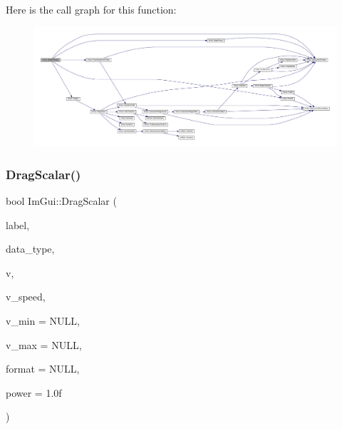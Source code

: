 Here is the call graph for this function\+:
\nopagebreak
\begin{figure}[H]
\begin{center}
\leavevmode
\includegraphics[width=350pt]{namespace_im_gui_ae3c5fcb2ff6c529d518a646a97a65186_cgraph}
\end{center}
\end{figure}
\mbox{\label{namespace_im_gui_a127eccba6a956933f8c0f35b9e55105e}} 
\subsubsection{\texorpdfstring{Drag\+Scalar()}{DragScalar()}}
{\footnotesize\ttfamily bool Im\+Gui\+::\+Drag\+Scalar (\begin{DoxyParamCaption}\item[{const char $\ast$}]{label,  }\item[{\mbox{\hyperlink{imgui_8h_a4cfa8697a3d76722fff83eb18922e9d5}{Im\+Gui\+Data\+Type}}}]{data\+\_\+type,  }\item[{void $\ast$}]{v,  }\item[{float}]{v\+\_\+speed,  }\item[{const void $\ast$}]{v\+\_\+min = {\ttfamily NULL},  }\item[{const void $\ast$}]{v\+\_\+max = {\ttfamily NULL},  }\item[{const char $\ast$}]{format = {\ttfamily NULL},  }\item[{float}]{power = {\ttfamily 1.0f} }\end{DoxyParamCaption})}

